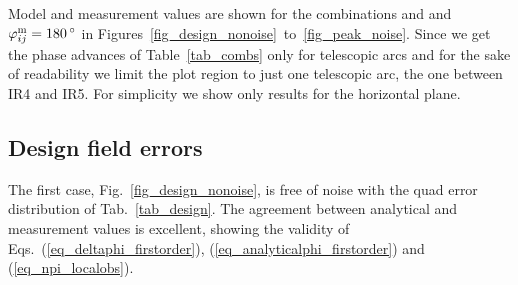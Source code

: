 Model and measurement values are shown for the combinations  and
 and $\varphi_{ij}^\text{m} = \SI{180}{^\circ}$ in Figures~\ref{fig_design_nonoise}~to~\ref{fig_peak_noise}.
Since we get the phase advances of Table~\ref{tab_combs} only for telescopic arcs and for the sake
of readability we limit the plot region to just one telescopic arc, the one between IR4 and IR5.
For simplicity we show only results for the horizontal plane. 


\subsection{Design field errors}

The first case, Fig.~\ref{fig_design_nonoise}, is free of noise with the quad error distribution of
Tab.~\ref{tab_design}.
The agreement between analytical and measurement values is excellent, showing the validity of
Eqs.~(\ref{eq_deltaphi_firstorder}), (\ref{eq_analyticalphi_firstorder}) and (\ref{eq_npi_localobs}).

